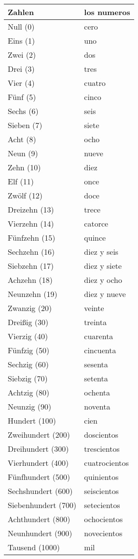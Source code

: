 \documentclass{spanish_summary}
\begin{document}
\begin{longtable}{p{} | p{}} 
\textbf{Zahlen}     & \textbf{los numeros}                                       \\ \hline
\hline
\endhead %
Null (0) & cero \\
Eins (1) & uno \\
Zwei (2) & dos \\
Drei (3) & tres \\
Vier (4) & cuatro \\
Fünf (5) & cinco \\
Sechs (6) & seis \\
Sieben (7) & siete \\
Acht (8) & ocho \\
Neun (9) & nueve \\
Zehn (10) & diez \\
Elf (11) & once \\
Zwölf (12) & doce \\
Dreizehn (13) & trece \\
Vierzehn (14) & catorce \\
Fünfzehn (15) & quince \\
Sechzehn (16) & diez y seis\\
Siebzehn (17) & diez y siete \\
Achzehn (18) & diez y ocho \\
Neunzehn (19) & diez y nueve \\
Zwanzig (20) & veinte \\
Dreißig (30) & treinta \\
Vierzig (40) & cuarenta \\
Fünfzig (50) & cincuenta \\
Sechzig (60) & sesenta \\
Siebzig (70) & setenta \\
Achtzig (80) & ochenta  \\
Neunzig (90) & noventa \\
Hundert (100) & cien \\
Zweihundert (200) & doscientos \\
Dreihundert (300) & trescientos \\
Vierhundert (400) & cuatrocientos \\
Fünfhundert (500) & quinientos \\
Sechshundert (600) & seiscientos \\
Siebenhundert (700) & setecientos \\
Achthundert (800) & ochocientos \\
Neunhundert (900) & novecientos \\
Tausend (1000) & mil \\

\end{longtable}
\end{document}
